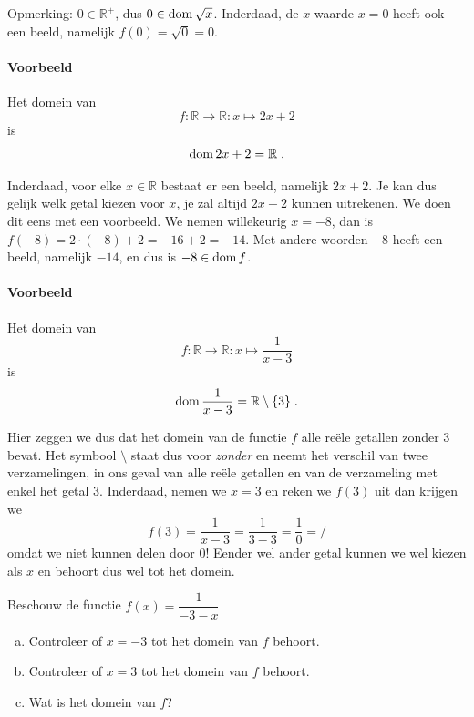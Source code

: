 \documentclass[12pt,twoside]{article}
\begin{document}
\begin{theorie}
Opmerking: $0\in\mathbb{R}^+$, dus $0\in\dom\sqrt{x}$. Inderdaad, de $x$-waarde $x=0$ heeft ook een beeld, namelijk $f(0)=\sqrt{0}=0$.

\paragraph{Voorbeeld}
Het domein van
$$f:\mathbb{R}\to\mathbb{R}:x\mapsto 2x+2$$
is
$$\dom 2x+2 = \mathbb{R}\;.$$

Inderdaad, voor elke $x\in\mathbb{R}$ bestaat er een beeld, namelijk $2x+2$. Je kan dus gelijk welk getal kiezen voor $x$, je zal altijd $2x+2$ kunnen uitrekenen. We doen dit eens met een voorbeeld. We nemen willekeurig $x=-8$, dan is $f(-8)=2\cdot(-8)+2=-16+2=-14$. Met andere woorden $-8$ heeft een beeld, namelijk $-14$, en dus is $-8\in\dom f$.

\paragraph{Voorbeeld}
Het domein van
$$f:\mathbb{R}\to\mathbb{R}:x\mapsto \dfrac{1}{x-3}$$
is
$$\dom \dfrac{1}{x-3} = \mathbb{R}\setminus\{3\}\;.$$

Hier zeggen we dus dat het domein van de functie $f$ alle reële getallen zonder $3$ bevat. Het symbool $\setminus$ staat dus voor {\em zonder} en neemt het verschil van twee verzamelingen, in ons geval van alle reële getallen en van de verzameling met enkel het getal $3$. Inderdaad, nemen we $x=3$ en reken we $f(3)$ uit dan krijgen we
$$f(3)=\dfrac{1}{x-3}=\dfrac{1}{3-3}=\dfrac{1}{0}=/$$
omdat we niet kunnen delen door $0$! Eender wel ander getal kunnen we wel kiezen als $x$ en behoort dus wel tot het domein.

\end{theorie}

\begin{oefening}
  Beschouw de functie $\displaystyle f(x)=\dfrac{1}{-3-x}$
  \begin{enumerate}[(a)]
  \item Controleer of $x=-3$ tot het domein van $f$ behoort.
  \item Controleer of $x=3$ tot het domein van $f$ behoort.
  \item Wat is het domein van $f$?
  \end{enumerate}
\end{oefening}
\end{document}
